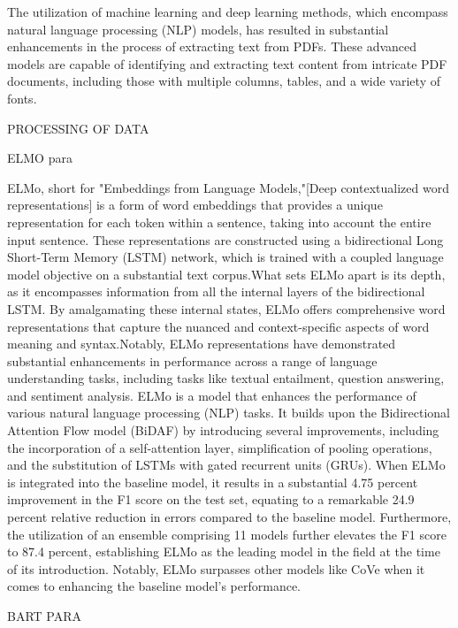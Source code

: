 \documentclass[conference]{IEEEtran}
\begin{document}
The utilization of machine learning and deep learning methods, which encompass natural language processing (NLP) models, has resulted in substantial enhancements in the process of extracting text from PDFs. These advanced models are capable of identifying and extracting text content from intricate PDF documents, including those with multiple columns, tables, and a wide variety of fonts.


PROCESSING OF DATA

ELMO para

ELMo, short for "Embeddings from Language Models,"[Deep contextualized word representations] is a form of word embeddings that provides a unique representation for each token within a sentence, taking into account the entire input sentence. These representations are constructed using a bidirectional Long Short-Term Memory (LSTM) network, which is trained with a coupled language model objective on a substantial text corpus.What sets ELMo apart is its depth, as it encompasses information from all the internal layers of the bidirectional LSTM. By amalgamating these internal states, ELMo offers comprehensive word representations that capture the nuanced and context-specific aspects of word meaning and syntax.Notably, ELMo representations have demonstrated substantial enhancements in performance across a range of language understanding tasks, including tasks like textual entailment, question answering, and sentiment analysis.
ELMo is a model that enhances the performance of various natural language processing (NLP) tasks. It builds upon the Bidirectional Attention Flow model (BiDAF) by introducing several improvements, including the incorporation of a self-attention layer, simplification of pooling operations, and the substitution of LSTMs with gated recurrent units (GRUs). When ELMo is integrated into the baseline model, it results in a substantial 4.75 percent  improvement in the F1 score on the test set, equating to a remarkable 24.9 percent relative reduction in errors compared to the baseline model. Furthermore, the utilization of an ensemble comprising 11 models further elevates the F1 score to 87.4 percent, establishing ELMo as the leading model in the field at the time of its introduction. Notably, ELMo surpasses other models like CoVe when it comes to enhancing the baseline model's performance.

BART PARA
\end{document}
